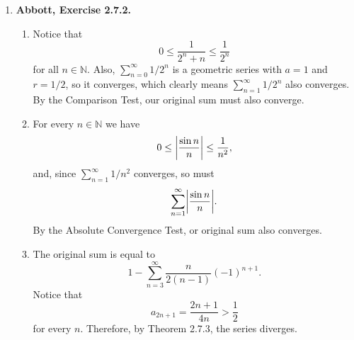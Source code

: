 \documentclass{article}
\DeclarePairedDelimiter\abs{\lvert}{\rvert}
\newcommand{\N}{\mathbb{N}}
\newcommand{\ra}{\rightarrow}
\newcommand{\exc}[2][Abbott]{\item \textbf{#1, Exercise #2.}}
\newcommand{\lep}[1][L]{#1et $\epsilon > 0$ be arbitrary}
\begin{document}
\begin{enumerate}
\begin{enumerate}
        
        \item It is easy to see with induction that $a_1 \geq S_n \geq 0$ for all $n \in \N$. Since $S_{2n}$ is increasing and bounded above by $a_1$, the Monotone Convergence Theorem guarantees its convergence. Also, ${S_{2n-1}}$ is decreasing and bounded below by $0$, so it must also converge. Now, we show that $(S_{2n})$ and $(S_{2n-1})$ are equivalent (Definition \ref{def_equivSequences}). \lep. Choose $N \in N$ such that $\abs*{a_n} < \epsilon$ for all $n \geq N$. Then, $\abs*{S_{2n}-S_{2n-1}} = \abs*{a_{2n}} \leq \abs*{a_n} < \epsilon$ for all $n \geq N$, so the sequences are equivalent. By Lemma \ref{lem_equivCauchySequences}, they must converge to the same real number $a$, and we've already shown in Exercise 2.3.5 that this means $(S_n) \ra a$ as well, since $(S_n)$ is the shuffled sequence of $(S_{2n-1})$ and $(S_{2n})$. 
    \end{enumerate}
    
    \exc{2.7.2}
    \begin{enumerate}
        \item Notice that 
        \begin{equation*}
            0 \leq \frac{1}{2^n+n} \leq \frac{1}{2^n}
        \end{equation*} for all $n \in \N$. Also, $\sum_{n=0}^\infty 1/2^n$ is a geometric series with $a = 1$ and $r = 1/2$, so it converges, which clearly means $\sum_{n=1}^\infty 1/2^n$ also converges. By the Comparison Test, our original sum must also converge.
        
        \item For every $n \in \N$ we have 
        \begin{equation*}
            0 \leq \abs*{\frac{\sin{n}}{n}} \leq \frac{1}{n^2},
        \end{equation*} and, since $\sum_{n=1}^\infty 1/n^2$ converges, so must 
        \begin{equation*}
            \sum_{n=1}^\infty \abs*{\frac{\sin{n}}{n}}.
        \end{equation*} By the Absolute Convergence Test, or original sum also converges.
        
        \item The original sum is equal to 
        \begin{equation*}
            1 - \sum_{n=3}^\infty \frac{n}{2(n-1)} (-1)^{n+1}.
        \end{equation*} Notice that 
        \begin{equation*}
            a_{2n+1} = \frac{2n+1}{4n} > \frac{1}{2}
        \end{equation*} for every $n$. Therefore, by Theorem 2.7.3, the series diverges.
        

\end{enumerate}
\end{enumerate}
\end{document}
